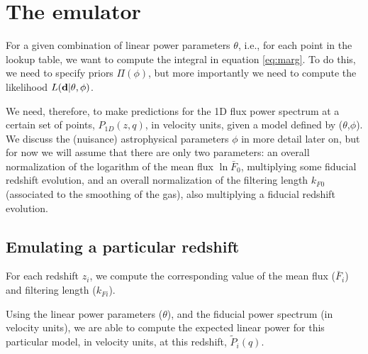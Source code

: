 \section{The emulator} \label{sec:emu}

For a given combination of linear power parameters $\theta$, i.e., for
each point in the lookup table, we want to compute the integral in
equation \ref{eq:marg}.
To do this, we need to specify priors $\Pi(\phi)$, but more importantly
we need to compute the likelihood $L(\mathbf{d} | \theta, \phi)$.

We need, therefore, to make predictions for the 1D flux power spectrum
at a certain set of points, $P_{1D}(z,q)$, in velocity units, given a model
defined by ($\theta$,$\phi$).
We discuss the (nuisance) astrophysical parameters $\phi$ in more detail
later on, but for now we will assume that there are only two parameters:
an overall normalization of the logarithm of the mean flux $\ln{\bar F_0}$,
multiplying some fiducial redshift evolution, and an overall normalization
of the filtering length $k_{F 0}$ (associated to the smoothing of the gas),
also multiplying a fiducial redshift evolution. 


\subsection{Emulating a particular redshift}

For each redshift $z_i$, we compute the corresponding value of the mean flux
($\bar F_i$) and filtering length ($k_{Fi}$).

Using the linear power parameters ($\theta$), and the fiducial
power spectrum (in velocity units), we are able to compute the expected
linear power for this particular model, in velocity units, at this redshift,
$\tilde P_i(q)$.

